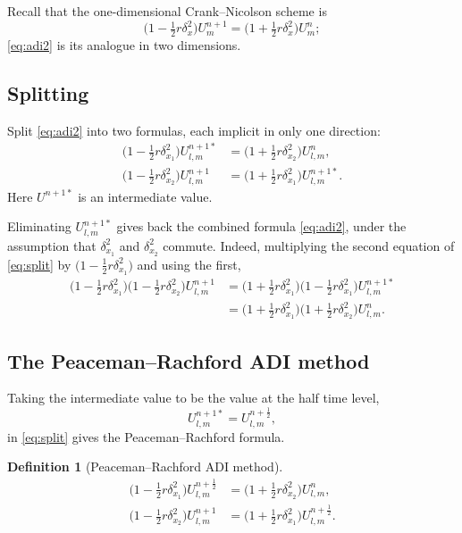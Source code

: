 \documentclass[11pt,a4paper]{article}
\numberwithin{equation}{section}
\theoremstyle{spacedplain}
\theoremstyle{spaceddefinition}
\newtheorem{definition}[theorem]{Definition}
\theoremstyle{spacedremark}
\begin{document}
Recall that the one-dimensional Crank--Nicolson scheme is
\[
  \bigl(1-\tfrac12r\delta_x^2\bigr)U_m^{n+1}
  =\bigl(1+\tfrac12r\delta_x^2\bigr)U_m^n ;
\]
\eqref{eq:adi2} is its analogue in two dimensions.

\subsection{Splitting}

Split \eqref{eq:adi2} into two formulas, each implicit in only one
direction:
\begin{equation}\label{eq:split}
\begin{aligned}
  \bigl(1-\tfrac12r\delta_{x_1}^2\bigr)U_{l,m}^{n+1*}
  &=\bigl(1+\tfrac12r\delta_{x_2}^2\bigr)U_{l,m}^n,\\
  \bigl(1-\tfrac12r\delta_{x_2}^2\bigr)U_{l,m}^{n+1}
  &=\bigl(1+\tfrac12r\delta_{x_1}^2\bigr)U_{l,m}^{n+1*}.
\end{aligned}
\end{equation}
Here \(U^{n+1*}\) is an intermediate value.

Eliminating \(U_{l,m}^{n+1*}\) gives back the combined formula
\eqref{eq:adi2}, under the assumption that \(\delta_{x_1}^2\) and
\(\delta_{x_2}^2\) commute.  Indeed, multiplying the second equation of
\eqref{eq:split} by \(\bigl(1-\tfrac12r\delta_{x_1}^2\bigr)\) and
using the first,
\begin{align*}
  \bigl(1-\tfrac12r\delta_{x_1}^2\bigr)
  \bigl(1-\tfrac12r\delta_{x_2}^2\bigr)U_{l,m}^{n+1}
  &=\bigl(1+\tfrac12r\delta_{x_1}^2\bigr)
    \bigl(1-\tfrac12r\delta_{x_1}^2\bigr)U_{l,m}^{n+1*}\\
  &=\bigl(1+\tfrac12r\delta_{x_1}^2\bigr)
    \bigl(1+\tfrac12r\delta_{x_2}^2\bigr)U_{l,m}^n .
\end{align*}

\subsection{The Peaceman--Rachford ADI method}

Taking the intermediate value to be the value at the half time level,
\[
  U_{l,m}^{n+1*}=U_{l,m}^{n+\frac12},
\]
in \eqref{eq:split} gives the Peaceman--Rachford formula.

\begin{keybox}
\begin{definition}[Peaceman--Rachford ADI method]
\begin{align*}
  \bigl(1-\tfrac12r\delta_{x_1}^2\bigr)U_{l,m}^{n+\frac12}
  &=\bigl(1+\tfrac12r\delta_{x_2}^2\bigr)U_{l,m}^n,\\
  \bigl(1-\tfrac12r\delta_{x_2}^2\bigr)U_{l,m}^{n+1}
  &=\bigl(1+\tfrac12r\delta_{x_1}^2\bigr)U_{l,m}^{n+\frac12}.
\end{align*}
\end{definition}
\end{keybox}
\end{document}
